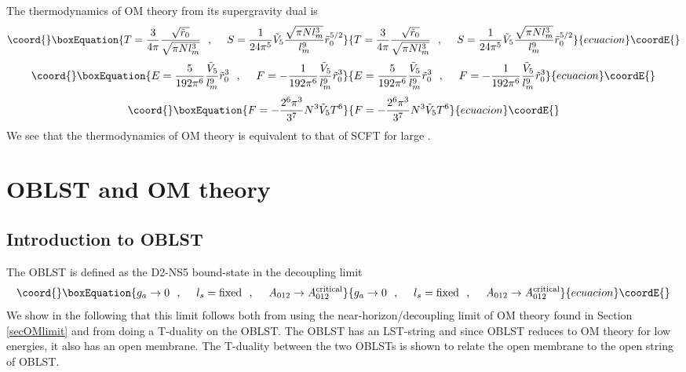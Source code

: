 \documentclass[a4paper,twoside,titlepage,12pt]{article}
\begin{document}
The thermodynamics of OM theory from its supergravity dual is
%
\begin{equation}\coord{}\boxEquation{
T = \frac{3}{4\pi}\frac{\sqrt{\tilde{r}_0}}{\sqrt{\pi N \lm^3}}
\spa
S = \frac{1}{24 \pi^5} \tilde{V}_5 
\frac{\sqrt{\pi N \lm^3}}{\lm^9 }
\tilde{r}_0^{5/2} 
}{
T = \frac{3}{4\pi}\frac{\sqrt{\tilde{r}_0}}{\sqrt{\pi N \lm^3}}
\spa
S = \frac{1}{24 \pi^5} \tilde{V}_5 
\frac{\sqrt{\pi N \lm^3}}{\lm^9 }
\tilde{r}_0^{5/2} 
}{ecuacion}\coordE{}\end{equation}
\begin{equation}\coord{}\boxEquation{
E = \frac{5}{192 \pi^6} \frac{\tilde{V}_5}{\lm^9} \tilde{r}_0^3
\spa
F = - \frac{1}{192 \pi^6} \frac{\tilde{V}_5}{\lm^9} \tilde{r}_0^3
}{
E = \frac{5}{192 \pi^6} \frac{\tilde{V}_5}{\lm^9} \tilde{r}_0^3
\spa
F = - \frac{1}{192 \pi^6} \frac{\tilde{V}_5}{\lm^9} \tilde{r}_0^3
}{ecuacion}\coordE{}\end{equation}
\begin{equation}\coord{}\boxEquation{
F = - \frac{2^6 \pi^3}{3^7} N^3 \tilde{V}_5 T^6
}{
F = - \frac{2^6 \pi^3}{3^7} N^3 \tilde{V}_5 T^6
}{ecuacion}\coordE{}\end{equation}
%
We see that the thermodynamics of OM theory is equivalent to that
of \coordHE{} SCFT for large \coordHE{}.



\section{\coordHE{} OBLST and OM theory}
\label{secOBLST20}
\subsection{Introduction to \coordHE{} OBLST}

The \coordHE{} OBLST is defined as the D2-NS5 bound-state 
in the decoupling limit
%
\begin{equation}\coord{}\boxEquation{
\gsna \rightarrow 0 \spa \lsn = \mbox{fixed} \spa 
A_{012} \rightarrow A^{\rm critical}_{012} 
}{
\gsna \rightarrow 0 \spa \lsn = \mbox{fixed} \spa 
A_{012} \rightarrow A^{\rm critical}_{012} 
}{ecuacion}\coordE{}\end{equation}
%
We show in the following that this limit follows both from
using the near-horizon/decoupling limit of OM theory found
in Section \ref{secOMlimit} and 
from doing a T-duality on the \coordHE{} OBLST.
The \coordHE{} OBLST has an LST-string and since 
\coordHE{} OBLST reduces to OM theory for low energies, it also has
an open membrane.
The T-duality between the two OBLSTs 
is shown to relate the open membrane to the
open string of \coordHE{} OBLST.
\end{document}
